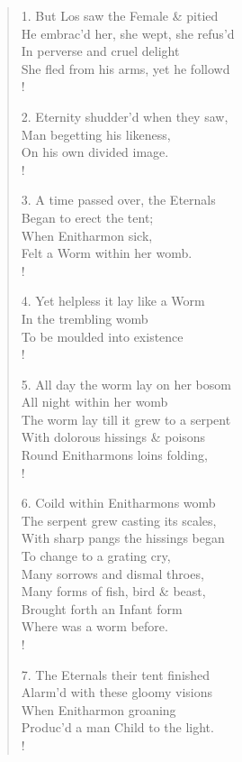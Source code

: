 \documentclass[9pt]{extarticle}
\begin{document}
\begin{verse}
\begin{altverse} 
		
		1. But Los saw the Female \& pitied\\
		He embrac'd her, she wept, she refus'd\\
		In perverse and cruel delight\\
		She fled from his arms, yet he followd\\!
		
		2. Eternity shudder'd when they saw,\\
		Man begetting his likeness,\\
		On his own divided image.\\!
		
		3. A time passed over, the Eternals\\
		Began to erect the tent;\\
		When Enitharmon sick,\\
		Felt a Worm within her womb.\\!
		
		4. Yet helpless it lay like a Worm\\
		In the trembling womb\\
		To be moulded into existence\\!
		
		5. All day the worm lay on her bosom\\
		All night within her womb\\
		The worm lay till it grew to a serpent\\
		With dolorous hissings \& poisons\\
		Round Enitharmons loins folding,\\!
		
		6. Coild within Enitharmons womb\\
		The serpent grew casting its scales,\\
		With sharp pangs the hissings began\\
		To change to a grating cry,\\
		Many sorrows and dismal throes,\\
		Many forms of fish, bird \& beast,\\
		Brought forth an Infant form\\
		Where was a worm before.\\!
		
		7. The Eternals their tent finished\\
		Alarm'd with these gloomy visions\\
		When Enitharmon groaning\\
		Produc'd a man Child to the light.\\!
		

\end{altverse}
\end{verse}
\end{document}
